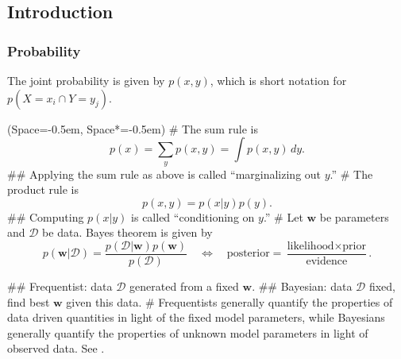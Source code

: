 \documentclass[12pt, a4paper]{article}
\newcommand{\listSpace}{-0.5em}%
\newcommand{\D}{\mathcal{D}}
\newcommand{\vect}[1]{\bm{#1}}
\begin{document}
\subsection{Introduction}


\subsubsection*{Probability}
The joint probability is given by $p(x, y)$, which is short notation for $p(X = x_i \cap Y = y_j)$.
\begin{easylist}[itemize]
	\ListProperties(Space=\listSpace, Space*=\listSpace)
	# The sum rule is 
	\begin{equation*}
	p(x) = \sum_y p(x, y) = \int p(x, y) \, dy.
	\end{equation*}
	## Applying the sum rule as above is called ``marginalizing out $y$.''
	# The product rule is 
	\begin{equation*}
	p(x, y) = p(x | y) p(y).
	\end{equation*}
	## Computing $p(x | y)$ is called ``conditioning on $y$.''
	# Let $\vect{w}$ be parameters and $\D$ be data.
	Bayes theorem is given by
	\begin{equation*}
	p(\vect{w} | \D) = \frac{p(\D | \vect{w}) p(\vect{w})}{p(\D)} \quad \Leftrightarrow \quad
	\text{posterior} = \frac{\text{likelihood} \times \text{prior}}{\text{evidence}}.
	\end{equation*}
	
	## Frequentist: data $\D$ generated from a fixed $\vect{w}$.
	## Bayesian: data $\D$ fixed, find best $\vect{w}$ given this data.
	# Frequentists generally quantify the properties of data driven
	quantities in light of the fixed model parameters,
	while Bayesians generally quantify the properties of unknown
	model parameters in light of observed data.
	See \cite{vanderplas_frequentism_2014}.
\end{easylist}
\end{document}
